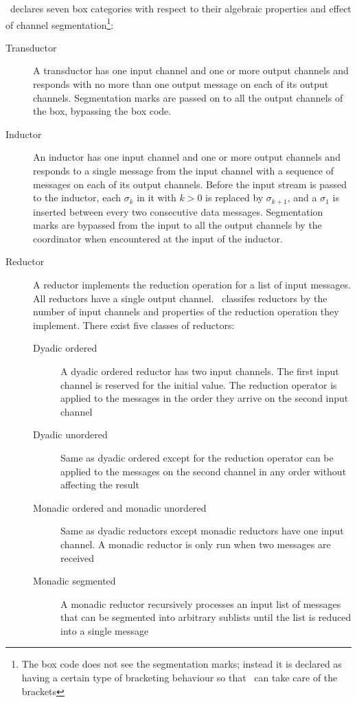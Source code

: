 \ak\ declares seven box categories with respect to their algebraic properties and effect of channel segmentation\footnote{The box code does not see the segmentation marks; instead it is declared as having a certain type of bracketing behaviour so that \ak\ can take care of the brackets}:
\begin{description}
\item[Transductor]
A transductor has one input channel and one or more output channels and responds with no more than one output message on each of its output channels. Segmentation marks are passed on to all the output channels of the box, bypassing the box code.

\item[Inductor]
An inductor has one input channel and one or more output channels and responds to a single message from the input channel with a sequence of messages on each of its output channels. Before the input stream is passed to the inductor, each $\sigma_k$ in it with $k > 0$ is replaced by $\sigma_{k+1}$, and a $\sigma_1$ is inserted between every two consecutive data messages. Segmentation marks are bypassed from the input to all the output channels by the coordinator when encountered at the input of the inductor.

\item[Reductor] A reductor implements the reduction operation for a list of input messages. All reductors have a single output channel. \ak\ classifes reductors by the number of input channels and properties of the reduction operation they implement. There exist five classes of reductors:

    \begin{description}
    \item[Dyadic ordered] A dyadic ordered reductor has two input channels. The first input channel is reserved for the initial value. The reduction operator is applied to the messages in the order they arrive on the second input channel

    \item[Dyadic unordered] Same as dyadic ordered except for the reduction operator can be applied to the messages on the second channel in any order without affecting the result

    \item[Monadic ordered and monadic unordered] Same as dyadic reductors except monadic reductors have one input channel. A monadic reductor is only run when two messages are received

    \item[Monadic segmented] A monadic reductor recursively processes an input list of messages that can be segmented into arbitrary sublists until the list is reduced into a single message
    \end{description}
\end{description}


